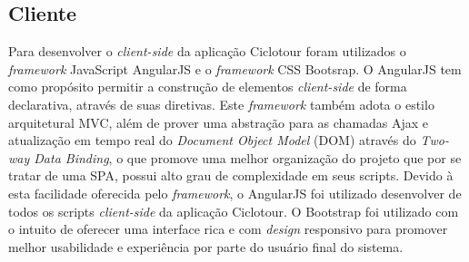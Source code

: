 \subsection{Cliente}
Para desenvolver o \textit{client-side} da aplicação Ciclotour foram utilizados o \textit{framework} JavaScript AngularJS e o \textit{framework} 
CSS Bootsrap. O AngularJS tem como propósito permitir a construção de elementos \textit{client-side} de forma declarativa, através de suas diretivas.
Este \textit{framework} também adota o estilo arquitetural MVC, além de prover uma abstração para as chamadas Ajax e atualização em tempo real do 
\textit{Document Object Model} (DOM) através do \textit{Two-way Data Binding}, o que promove uma melhor organização do projeto que por se tratar de
uma SPA, possui alto grau de complexidade em seus scripts. Devido à esta facilidade oferecida pelo \textit{framework}, o AngularJS foi utilizado 
desenvolver de todos os scripts \textit{client-side} da aplicação Ciclotour. O Bootstrap foi utilizado com o intuito de oferecer uma interface rica 
e com \textit{design} responsivo para promover melhor usabilidade e experiência por parte do usuário final do sistema.